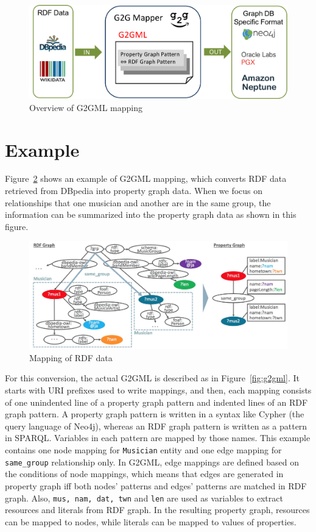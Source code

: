 \documentclass[runningheads]{llncs}
\begin{document}
\begin{figure}
\center
\includegraphics[width=1.0\textwidth]{dataflow.png}
\caption{Overview of G2GML mapping}
\label{fig:dataflow}
\end{figure}

\section{Example}

Figure~\ref{fig:conversion} shows an example of G2GML mapping, which converts RDF data retrieved from DBpedia into property graph data. When we focus on relationships that one musician and another are in the same group, the information can be summarized into the property graph data as shown in this figure.

\begin{figure}
\center
\includegraphics[width=1.0\textwidth]{example.jpg}
\caption{Mapping of RDF data}
\label{fig:conversion}
\end{figure}

For this conversion, the actual G2GML is described as in Figure~\ref{fig:g2gml}. It starts with URI prefixes used to write mappings, and then, each mapping consists of one unindented line of a property graph pattern and indented lines of an RDF graph pattern. A property graph pattern is written in a syntax like Cypher (the query language of Neo4j), whereas an RDF graph pattern is written as a pattern in SPARQL. Variables in each pattern are mapped by those names. This example contains one node mapping for \texttt{Musician} entity and one edge mapping for \texttt{same\_group} relationship only. In G2GML, edge mappings are defined based on the conditions of node mappings, which means that edges are generated in property graph iff both nodes' patterns and edges' patterns are matched in RDF graph. Also, \texttt{mus, nam, dat, twn} and \texttt{len} are used as variables to extract resources and literals from RDF graph. In the resulting property graph, resources can be mapped to nodes, while literals can be mapped to values of properties.
\end{document}
